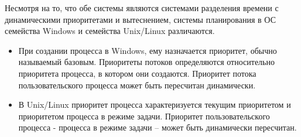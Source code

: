 Несмотря на то, что обе системы являются системами разделения времени с динамическими приоритетами и вытеснением, системы планирования в ОС семейства Windows и семейства Unix/Linux различаются.

\begin{itemize}
    \item При создании процесса в Windows, ему назначается приоритет, обычно называемый базовым. Приоритеты потоков определяются относительно приоритета процесса, в котором они создаются. Приоритет потока пользовательского процесса может быть пересчитан динамически.
    \item В Unix/Linux приоритет процесса характеризуется текущим приоритетом и приоритетом процесса в режиме задачи. Приоритет пользовательского процесса - процесса в режиме задачи – может быть динамически пересчитан.
\end{itemize}
